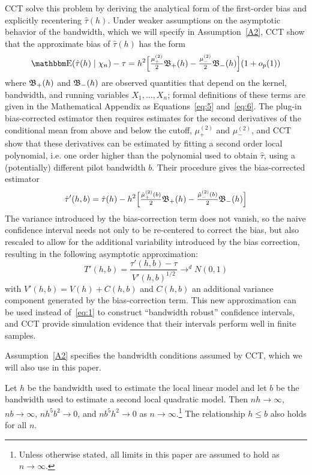 \documentclass[12pt,fleqn]{article}
\begin{document}
CCT solve this problem by deriving the analytical form of the first-order bias
and explicitly recentering $\hat\tau(h)$. Under weaker assumptions on the
asymptotic behavior of the bandwidth, which we will specify in
Assumption~\ref{A2}, CCT show that the approximate bias of $\hat\tau(h)$ has the
form
\begin{equation*}
  \E(\hat{\tau}(h) \mid \chi_{n}) - \tau =
  h^{2}\Big[ \tfrac{\mu_{+}^{(2)}}{2}\Bf_{+}(h)
  - \tfrac{\mu_{-}^{(2)}}{2}\Bf_{-}(h) \Big]
  (1+o_{p}(1))
\end{equation*}
where $\mathfrak{B}_{+}(h)$ and $\mathfrak{B}_{-}(h)$ are observed quantities that depend on the
kernel, bandwidth, and running variables $X_1,\dots,X_n$; formal definitions of
these terms are given in the Mathematical Appendix as Equations~\eqref{eq:5}
and~\eqref{eq:6}. The plug-in bias-corrected estimator then requires estimates
for the second derivatives of the conditional mean from above and below the
cutoff, $\mu_{+}^{(2)}$ and $\mu_{-}^{(2)}$, and CCT show that these derivatives
can be estimated by fitting a second order local polynomial, i.e. one order
higher than the polynomial used to obtain $\hat{\tau}$, using a (potentially)
different pilot bandwidth $b$. Their procedure gives the bias-corrected
estimator
\begin{gather*}
  \hat{\tau}'(h, b) = \hat{\tau}(h) - h^{2}
  \Big[\tfrac{\hat{\mu}_{+}^{(2)}(b)}{2} \mathfrak{B}_{+}(h)
  - \tfrac{\hat{\mu}_{-}^{(2)}(b)}{2}\mathfrak{B}_{-}(h) \Big]
\end{gather*}
The variance introduced by the bias-correction term does not vanish, so the
naive confidence interval needs not only to be re-centered to correct the bias,
but also rescaled to allow for the additional variability introduced by the bias
correction, resulting in the following asymptotic approximation:
\begin{equation*}
  T'(h, b) = \frac{\hat{\tau}'(h, b) - \tau}{V'(h, b)^{1/2}}
  \to^d N(0,1)
\end{equation*}
with $V'(h, b) = V(h) + C(h, b)$ and $C(h, b)$ an additional variance component
generated by the bias-correction term. This new approximation can be used
instead of~\eqref{eq:1} to construct ``bandwidth robust'' confidence intervals,
and CCT provide simulation evidence that their intervals perform well in finite
samples.

Assumption~\ref{A2} specifies the bandwidth conditions assumed by CCT, which we
will also use in this paper.
\begin{assumption}[Bandwidth]\label{A2}
  Let $h$ be the bandwidth used to estimate the local linear model and let
  $b$ be the bandwidth used to estimate a second local quadratic model. Then
  $n h \to \infty$, $n b \to \infty$, $n h^{5} b^{2} \to 0$, and
  $n b^{5} h^{2} \to 0$ as $n \to \infty$.\footnote{%
    Unless otherwise stated, all limits in this paper are assumed to hold as
    $n \to \infty$.} %
  The relationship $h \leq b$ also holds for all $n$.
\end{assumption}
\end{document}
